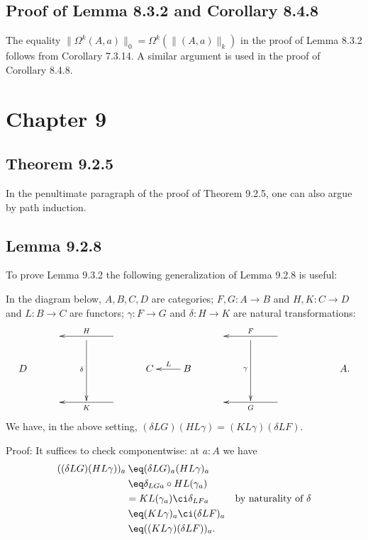 \documentclass[12pt]{article}
\begin{document}

\subsection{Proof of Lemma 8.3.2 and Corollary 8.4.8}

The equality $\lVert\Omega^k(A,a)\rVert_0=\Omega^k(\lVert(A,a)\rVert_k)$ in the proof of Lemma 8.3.2 follows from Corollary 7.3.14. A similar argument is used in the proof of Corollary 8.4.8.


\section{Chapter 9}

\subsection{Theorem 9.2.5}

In the penultimate paragraph of the proof of Theorem 9.2.5, one can also argue by path induction.


\subsection{Lemma 9.2.8}\label{928}

To prove Lemma 9.3.2 the following generalization of Lemma 9.2.8 is useful:

In the diagram below, $A,B,C,D$ are categories; $F,G:A\to B$ and $H,K:C\to D$ and $L:B\to C$ are functors; $\gamma:F\to G$ and $\delta:H\to K$ are natural transformations:
$$
\xymatrix{
&&\ar[dd]_\delta&\ar[ll]_H&&&&\ar[dd]_\gamma&\ar[ll]_F\\
D&&&&C&B\ar[l]_L&&&&&A.\\
&&&\ar[ll]^K&&&&&\ar[ll]^G}
$$ 
We have, in the above setting, $(\delta LG)(HL\gamma)=(KL\gamma)(\delta LF)$.

\nn Proof: It suffices to check componentwise: at $a:A$ we have
\begin{align*}
((\delta LG)(HL\gamma))_a
&\:\eq(\delta LG)_{a}(HL\gamma)_a\\
&\:\eq\delta_{LGa}\circ HL(\gamma_a)\\
&= KL(\gamma_a)\ci\delta_{LFa}&\text{by naturality of $\delta$}\\
&\:\eq(KL\gamma)_a\ci(\delta LF)_a\\
&\:\eq((KL\gamma)(\delta LF))_a.
\end{align*}
\end{document}
